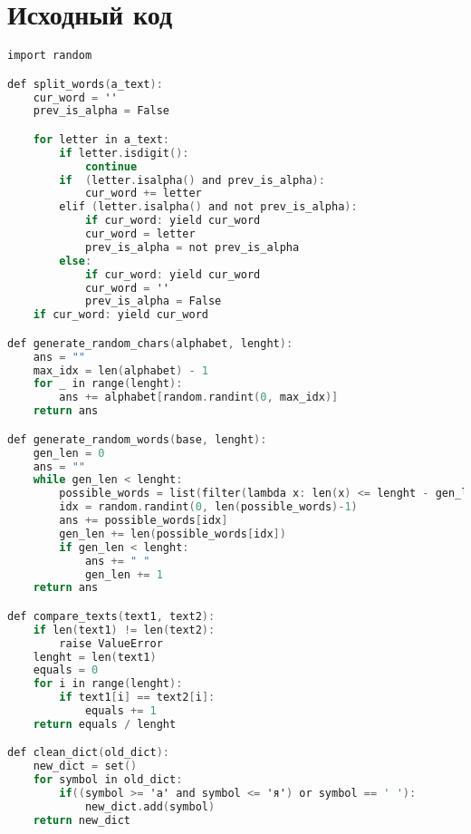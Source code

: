\section{Исходный код}
\begin{lstlisting}[language=C]
import random

def split_words(a_text):
    cur_word = ''
    prev_is_alpha = False

    for letter in a_text:
        if letter.isdigit():
            continue
        if  (letter.isalpha() and prev_is_alpha):
            cur_word += letter
        elif (letter.isalpha() and not prev_is_alpha):
            if cur_word: yield cur_word
            cur_word = letter
            prev_is_alpha = not prev_is_alpha
        else:
            if cur_word: yield cur_word
            cur_word = ''
            prev_is_alpha = False
    if cur_word: yield cur_word

def generate_random_chars(alphabet, lenght):
    ans = ""
    max_idx = len(alphabet) - 1
    for _ in range(lenght):
        ans += alphabet[random.randint(0, max_idx)]
    return ans

def generate_random_words(base, lenght):
    gen_len = 0
    ans = ""
    while gen_len < lenght:
        possible_words = list(filter(lambda x: len(x) <= lenght - gen_len, base))
        idx = random.randint(0, len(possible_words)-1)
        ans += possible_words[idx]
        gen_len += len(possible_words[idx])
        if gen_len < lenght:
            ans += " "
            gen_len += 1
    return ans

def compare_texts(text1, text2):
    if len(text1) != len(text2):
        raise ValueError
    lenght = len(text1)
    equals = 0
    for i in range(lenght):
        if text1[i] == text2[i]:
            equals += 1
    return equals / lenght

def clean_dict(old_dict):
    new_dict = set()
    for symbol in old_dict:
        if((symbol >= 'а' and symbol <= 'я') or symbol == ' '):
            new_dict.add(symbol)
    return new_dict


\end{lstlisting}
